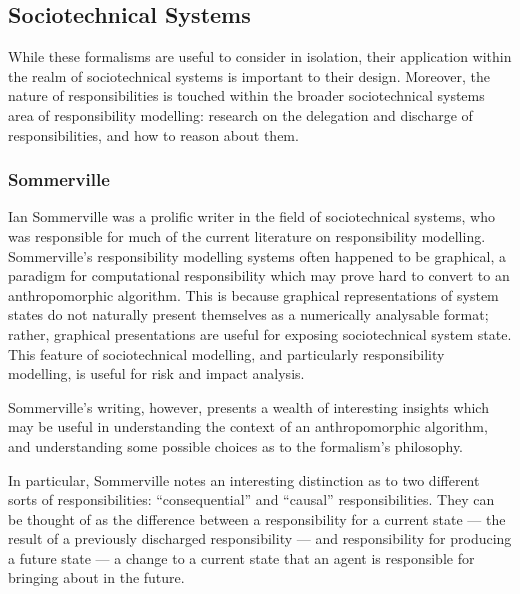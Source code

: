 \subsection{Sociotechnical Systems}
While these formalisms are useful to consider in isolation, their application within the realm of sociotechnical systems is important to their design. Moreover, the nature of responsibilities is touched within the broader sociotechnical systems area of responsibility modelling: research on the delegation and discharge of responsibilities, and how to reason about them.\par

\subsubsection{Sommerville~\cite{sommerville_graphical_responsibility,sommerville_dependable_systems_chap_8,sommerville_dependable_systems_chapter_9}}
Ian Sommerville was a prolific writer in the field of sociotechnical systems, who was responsible for much of the current literature on responsibility modelling\cite{sommerville_graphical_responsibility,sommerville_dependable_systems_chap_8,sommerville_dependable_systems_chapter_9}. Sommerville's responsibility modelling systems often happened to be graphical\cite{sommerville_graphical_responsibility}, a paradigm for computational responsibility which may prove hard to convert to an anthropomorphic algorithm. This is because graphical representations of system states do not naturally present themselves as a numerically analysable format; rather, graphical presentations are useful for exposing sociotechnical system state. This feature of sociotechnical modelling, and particularly responsibility modelling, is useful for risk and impact analysis\cite{ObashiMethodology}.\par

Sommerville's writing, however, presents a wealth of interesting insights which may be useful in understanding the context of an anthropomorphic algorithm, and understanding some possible choices as to the formalism's philosophy.\par

In particular, Sommerville notes an interesting distinction as to two different sorts of responsibilities: ``consequential'' and ``causal'' responsibilities. They can be thought of as the difference between a responsibility for a current state --- the result of a previously discharged responsibility --- and responsibility for producing a future state --- a change to a current state that an agent is responsible for bringing about in the future.\par

